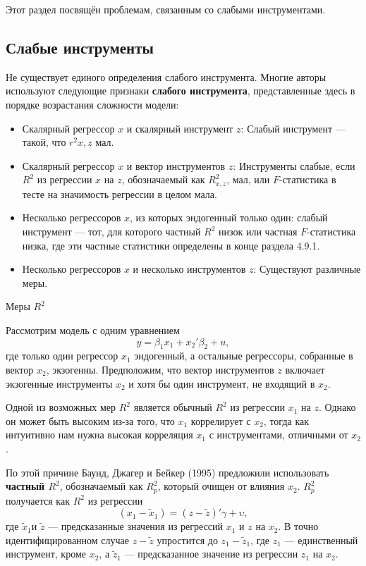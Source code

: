 Этот раздел посвящён проблемам, связанным со слабыми инструментами.

\subsection{Слабые инструменты}

Не существует единого определения слабого инструмента. Многие авторы используют следующие признаки \textbf{слабого инструмента}, представленные здесь в порядке возрастания сложности модели:
\begin{small}
\begin{itemize}
\item Скалярный регрессор $x$ и скалярный инструмент $z$: Слабый инструмент --- такой, что $r^2{x,z}$ мал.
\item Скалярный регрессор $x$ и вектор инструментов $z$: Инструменты слабые, если $R^2$ из регрессии $x$ на $z$, обозначаемый как $R^2_{x,z}$, мал, или $F$-статистика в тесте на значимость регрессии в целом мала.
\item Несколько регрессоров $x$, из которых эндогенный только один: слабый инструмент --- тот, для которого частный $R^2$ низок или частная $F$-статистика низка, где эти частные статистики определены в конце раздела 4.9.1. 
\item Несколько регрессоров $x$ и несколько инструментов $z$: Существуют различные меры.
\end{itemize}
\end{small}

\begin{center}
Меры $R^2$
\end{center}
Рассмотрим модель с одним уравнением
\begin{equation}
y = \beta_1 x_1 + x_2'\beta_2 +u,
\end{equation}
где только один регрессор $x_1$ эндогенный, а остальные регрессоры, собранные в вектор $x_2$, экзогенны. Предположим, что вектор инструментов $z$ включает экзогенные инструменты $x_2$ и хотя бы один инструмент, не входящий в $x_2$.

Одной из возможных мер $R^2$ является обычный $R^2$ из регрессии $x_1$ на $z$. Однако он может быть высоким из-за того, что $x_1$ коррелирует с $x_2$, тогда как интуитивно нам нужна высокая корреляция $x_1$ с инструментами, отличными от $x_2$.

По этой причине Баунд, Джагер и Бейкер (1995) предложили использовать \textbf{частный $R^2$}, обозначаемый как $R^2_p$, который очищен от влияния $x_2$. $R^2_p$ получается как $R^2$ из регрессии  
\begin{equation}
(x_1-\tilde{x}_1)= (z-\widetilde{z})'\gamma + \upsilon,
\end{equation}
где $\tilde{x}_1$и  $\tilde{z}$ --- предсказанные значения из регрессий $x_1$ и $z$ на $x_2$. В точно идентифицированном случае $z-\tilde{z}$ упростится до $z_1-\tilde{z}_1$, где $z_1$ --- единственный инструмент, кроме $x_2$, а $\tilde{z}_1$ --- предсказанное значение из регрессии $z_1$ на $x_2$.

